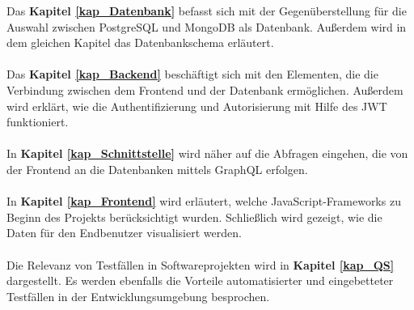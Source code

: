 Das \textbf{Kapitel \ref{kap_Datenbank}} befasst sich mit der Gegenüberstellung für die Auswahl zwischen PostgreSQL und MongoDB als Datenbank. Außerdem wird in dem gleichen Kapitel das Datenbankschema erläutert.
\\\\
Das \textbf{Kapitel \ref{kap_Backend}} beschäftigt sich mit den Elementen, die die Verbindung zwischen dem Frontend und der Datenbank ermöglichen. Außerdem wird erklärt, wie die Authentifizierung und Autorisierung mit Hilfe des JWT funktioniert.
\\\\
In \textbf{Kapitel \ref{kap_Schnittstelle}} wird näher auf die Abfragen eingehen, die von der Frontend an die Datenbanken mittels GraphQL erfolgen.
\\\\
In \textbf{Kapitel \ref{kap_Frontend}} wird erläutert, welche JavaScript-Frameworks zu Beginn des Projekts berücksichtigt wurden. Schließlich wird gezeigt, wie die Daten für den Endbenutzer visualisiert werden.
\\\\
Die Relevanz von Testfällen in Softwareprojekten wird in \textbf{Kapitel \ref{kap_QS}} dargestellt. Es werden ebenfalls die Vorteile automatisierter und eingebetteter Testfällen in der Entwicklungsumgebung besprochen.

